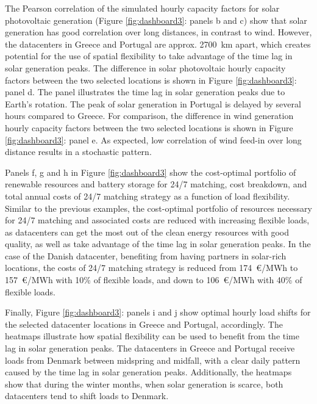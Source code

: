 The Pearson correlation of the simulated hourly capacity factors for solar photovoltaic generation (Figure \ref{fig:dashboard3}: panels b and c) show that solar generation has good correlation over long distances, in contrast to wind. However, the datacenters in Greece and Portugal are approx. 2700~km apart, which creates potential for the use of spatial flexibility to take advantage of the time lag in solar generation peaks. The difference in solar photovoltaic hourly capacity factors between the two selected locations is shown in Figure \ref{fig:dashboard3}: panel d. The panel illustrates the time lag in solar generation peaks due to Earth's rotation. The peak of solar generation in Portugal is delayed by several hours compared to Greece. For comparison, the difference in wind generation hourly capacity factors between the two selected locations is shown in Figure \ref{fig:dashboard3}: panel e. As expected, low correlation of wind feed-in over long distance results in a stochastic pattern.

Panels f, g and h in Figure \ref{fig:dashboard3} show the cost-optimal portfolio of renewable resources and battery storage for 24/7 matching, cost breakdown, and total annual costs of 24/7 matching strategy as a function of load flexibility. Similar to the previous examples, the cost-optimal portfolio of resources necessary for 24/7 matching and associated costs are reduced with increasing flexible loads, as datacenters can get the most out of the clean energy resources with good quality, as well as take advantage of the time lag in solar generation peaks. In the case of the Danish datacenter, benefiting from having partners in solar-rich locations, the costs of 24/7 matching strategy is reduced from 174~\euro/MWh to 157~\euro/MWh with 10\% of flexible loads, and down to 106~\euro/MWh with 40\% of flexible loads.

Finally, Figure \ref{fig:dashboard3}: panels i and j show optimal hourly load shifts for the selected datacenter locations in Greece and Portugal, accordingly. The heatmaps illustrate how spatial flexibility can be used to benefit from the time lag in solar generation peaks. The datacenters in Greece and Portugal receive loads from Denmark between midspring and midfall, with a clear daily pattern caused by the time lag in solar generation peaks. Additionally, the heatmaps show that during the winter months, when solar generation is scarce, both datacenters tend to shift loads to Denmark.

